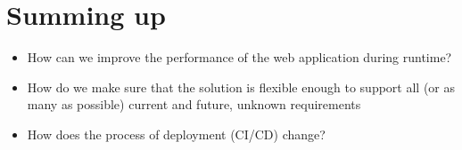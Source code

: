 \section{Summing up}

\begin{itemize}
	\item How can we improve the performance of the web application during runtime?
	\item How do we make sure that the solution is flexible enough to support all (or as many as possible) current and future, unknown requirements
	\item How does the process of deployment (CI/CD) change?
\end{itemize}